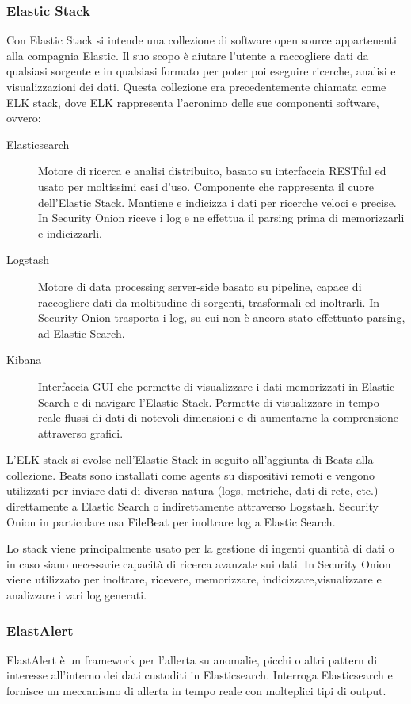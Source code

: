 \subsubsection*{Elastic Stack}
Con Elastic Stack \cite{elasticstack} si intende una collezione di software open source appartenenti alla compagnia Elastic.
Il suo scopo è aiutare l'utente a raccogliere dati da qualsiasi sorgente e in qualsiasi formato per poter poi eseguire ricerche, analisi e visualizzazioni dei dati.
Questa collezione era precedentemente chiamata come ELK stack, dove ELK rappresenta l'acronimo delle sue componenti software, ovvero:
\begin{description}
    \item [Elasticsearch] Motore di ricerca e analisi distribuito, basato su interfaccia RESTful ed usato per moltissimi casi d'uso. Componente che rappresenta il cuore dell'Elastic Stack. Mantiene e indicizza i  dati per ricerche veloci e precise. 
    In Security Onion riceve i log e ne effettua il parsing prima di memorizzarli e indicizzarli.
    \item [Logstash] Motore di data processing server-side basato su pipeline, capace di raccogliere dati da moltitudine di sorgenti, trasformali ed inoltrarli.
    In Security Onion trasporta i log, su cui non è ancora stato effettuato parsing,  ad Elastic Search.
    \item [Kibana] Interfaccia GUI  che permette di visualizzare i dati memorizzati in Elastic Search e di navigare l'Elastic Stack. Permette di visualizzare in tempo reale flussi di dati di notevoli dimensioni e di aumentarne la comprensione attraverso grafici.
\end{description}

L'ELK stack si evolse nell'Elastic Stack in seguito all'aggiunta di Beats alla collezione.
Beats sono installati come agents su dispositivi remoti e vengono utilizzati per inviare dati di diversa natura (logs, metriche, dati di rete, etc.) direttamente a Elastic Search  o indirettamente attraverso Logstash. Security Onion in particolare usa FileBeat per inoltrare log a Elastic Search.

Lo stack viene principalmente usato per la gestione di ingenti quantità di dati o in caso siano necessarie capacità di ricerca avanzate sui dati. In Security Onion viene utilizzato per inoltrare, ricevere, memorizzare, indicizzare,visualizzare e analizzare i vari log generati.

\subsubsection*{ElastAlert}
ElastAlert \cite{elastalert} è un framework per l'allerta su anomalie, picchi  o altri pattern di interesse all'interno dei dati custoditi in Elasticsearch. Interroga Elasticsearch e fornisce un meccanismo di allerta in tempo reale con molteplici tipi di output. 

